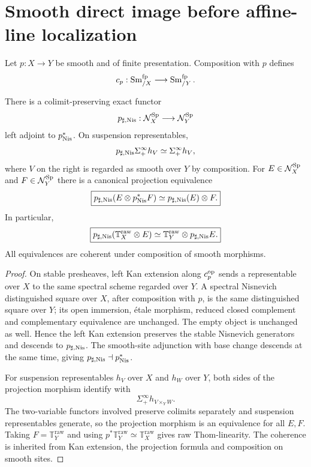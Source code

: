 \section{Smooth direct image before affine-line localization}
\label{sec:bn-diff-thom-stable-smooth-direct-image}

Let \(p:X\to Y\) be smooth and of finite presentation.  Composition with
\(p\) defines
\[
  c_p:\operatorname{Sm}^{\mathrm{fp}}_{/X}
  \longrightarrow
  \operatorname{Sm}^{\mathrm{fp}}_{/Y}.
\]

\begin{proposition}
\label{prop:bn-diff-stable-nis-smooth-direct-image}
There is a colimit-preserving exact functor
\[
  p_{\sharp,\mathrm{Nis}}:\mathcal N_X^{\mathrm{Sp}}\longrightarrow\mathcal N_Y^{\mathrm{Sp}}
\]
left adjoint to \(p^*_{\mathrm{Nis}}\).  On suspension representables,
\[
  p_{\sharp,\mathrm{Nis}}\Sigma^\infty_+h_V
  \simeq
  \Sigma^\infty_+h_V,
\]
where \(V\) on the right is regarded as smooth over \(Y\) by composition.
For \(E\in\mathcal N_X^{\mathrm{Sp}}\) and \(F\in\mathcal N_Y^{\mathrm{Sp}}\) there is a canonical
projection equivalence
\[
  \boxed{
  p_{\sharp,\mathrm{Nis}}(E\otimes p^*_{\mathrm{Nis}}F)
  \simeq
  p_{\sharp,\mathrm{Nis}}(E)\otimes F.
  }
\]
In particular,
\[
  \boxed{
  p_{\sharp,\mathrm{Nis}}
  (\mathbb T_X^{\mathrm{raw}}\otimes E)
  \simeq
  \mathbb T_Y^{\mathrm{raw}}\otimes p_{\sharp,\mathrm{Nis}}E.
  }
\]
All equivalences are coherent under composition of smooth morphisms.
\end{proposition}

\begin{proof}
On stable presheaves, left Kan extension along \(c_p^{\mathrm{op}}\) sends a
representable over \(X\) to the same spectral scheme regarded over \(Y\).
A spectral Nisnevich distinguished square over \(X\), after composition with
\(p\), is the same distinguished square over \(Y\); its open immersion,
\'etale morphism, reduced closed complement and complementary equivalence are
unchanged.  The empty object is unchanged as well.  Hence the left Kan
extension preserves the stable Nisnevich generators and descends to
\(p_{\sharp,\mathrm{Nis}}\).  The smooth-site adjunction with base change descends at
the same time, giving \(p_{\sharp,\mathrm{Nis}}\dashv p^*_{\mathrm{Nis}}\).

For suspension representables \(h_V\) over \(X\) and \(h_W\) over \(Y\), both
sides of the projection morphism identify with
\[
  \Sigma^\infty_+h_{V\times_YW}.
\]
The two-variable functors involved preserve colimits separately and suspension
representables generate, so the projection morphism is an equivalence for all
\(E,F\).  Taking \(F=\mathbb T_Y^{\mathrm{raw}}\) and using
\(p^*\mathbb T_Y^{\mathrm{raw}}\simeq\mathbb T_X^{\mathrm{raw}}\) gives raw
Thom-linearity.  The coherence is inherited from Kan extension, the projection
formula and composition on smooth sites.
\end{proof}

